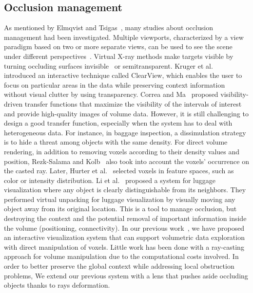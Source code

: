 \subsection{Occlusion management}
As mentioned by Elmqvist and Tsigas~\cite{4483791}, many studies about occlusion management had been investigated. Multiple viewports, characterized by a view paradigm based on two or more separate views, can be used to see the scene under different perspectives~\cite{WangBaldonado:2000:GUM:345513.345271}. Virtual X-ray methods make targets visible by turning occluding surfaces invisible~\cite{Burns:2008:ACC:1457515.1409107} or semitransparent. Kruger et al.~\cite{4015450} introduced an interactive technique called ClearView, which enables the user to focus on particular areas in the data while preserving context information without visual clutter by using transparency. Correa and Ma~\cite{5416704} proposed visibility-driven transfer functions that maximize the visibility of the intervals of interest and provide high-quality images of volume data. However, it is still challenging to design a good transfer function, especially when the system has to deal with heterogeneous data. For instance, in baggage inspection, a dissimulation strategy is to hide a threat among objects with the same density. For direct volume rendering, in addition to removing voxels according to their density values and position, Rezk-Salama and Kolb~\cite{CGF:CGF979} also took into account the voxels' occurrence on the casted ray. Later, Hurter et al.~\cite{6787171} selected voxels in feature spaces, such as color or intensity distribution.
Li et al.~\cite{Li:2012:LVV:2425296.2425325} proposed a system for luggage visualization where any object is clearly distinguishable from its neighbors. They performed virtual unpacking for luggage visualization by visually moving any object away from its original location. This is a tool to manage occlusion, but destroying the context and the potential removal of important information inside the volume (positioning, connectivity).  In our previous work~\cite{7819413}, we have proposed an interactive visualization system that can support volumetric data exploration with direct manipulation of voxels. Little work has been done with a ray-casting approach for volume manipulation due to the computational costs involved. In order to better preserve the global context while addressing local obstruction problems,  We extend our previous system with a lens that pushes aside occluding objects thanks to rays deformation.  

